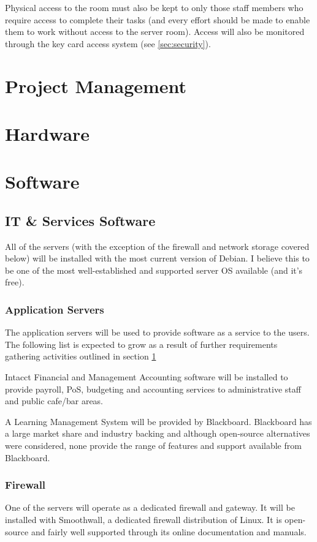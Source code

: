 \documentclass[a4paper, twoside]{article}
\begin{document}
Physical access to the room must also be kept to only those staff members who
require access to complete their tasks (and every effort should be made to
enable them to work without access to the server room). Access will also be
monitored through the key card access system (see \ref{sec:security}).

\section{Project Management}
\label{sec:projman}

\section{Hardware}

\section{Software}
\subsection{IT \& Services Software}
All of the servers (with the exception of the firewall and network storage covered below) will be installed with the most current version of Debian. I
believe this to be one of the most well-established and supported server OS
available (and it's free).

\subsubsection{Application Servers}
The application servers will be used to provide software as a service to the
users. The following list is expected to grow as a result of further
requirements gathering activities outlined in section \ref{sec:projman}

Intacct Financial and Management Accounting software will be installed to
provide payroll, PoS, budgeting and accounting services to administrative staff
and public cafe/bar areas.

A Learning Management System will be provided by Blackboard. Blackboard has a
large market share and industry backing \cite{bb} and although open-source
alternatives were considered, none provide the range of features and support
available from Blackboard.

\subsubsection{Firewall}
One of the servers will operate as a dedicated firewall and gateway. It will be
installed with Smoothwall, a dedicated firewall distribution of Linux. It is
open-source and fairly well supported through its online documentation and
manuals.
\end{document}
